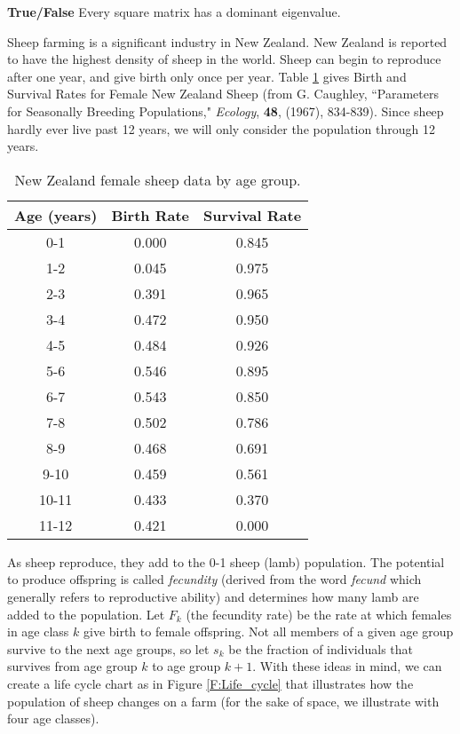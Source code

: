 \item \textbf{True/False} Every square matrix has a dominant eigenvalue. 
\ea

\ee


Sheep farming is a significant industry in New Zealand. New Zealand is reported to have the highest density of sheep in the world. Sheep can begin to reproduce after one year, and give birth only once per year. Table \ref{T:Sheep} gives Birth and Survival Rates for Female New Zealand Sheep (from G. Caughley, ``Parameters for Seasonally Breeding Populations," \emph{Ecology}, \textbf{48}, (1967), 834-839). Since sheep hardly ever live past 12 years, we will only consider the population through 12 years.
\begin{table}[h]
\begin{center}
\begin{tabular}{| c | c | c |}  \hline
Age (years) &Birth Rate 	&Survival Rate \\ \hline
0-1 		&0.000 			&0.845 \\ \hline
1-2 		&0.045 			&0.975 \\ \hline
2-3 		&0.391 			&0.965 \\ \hline
3-4 		&0.472 			&0.950 \\ \hline
4-5 		&0.484 			&0.926 \\ \hline
5-6 		&0.546 			&0.895 \\ \hline
6-7 		&0.543 			&0.850 \\ \hline
7-8 		&0.502 			&0.786 \\ \hline
8-9 		&0.468 			&0.691 \\ \hline
9-10 		&0.459 			&0.561 \\ \hline
10-11 	&0.433 			&0.370 \\ \hline
11-12 	&0.421 			&0.000 \\ \hline
\end{tabular}
\caption{New Zealand female sheep data by age group.}
\label{T:Sheep}
\end{center}
\end{table}

As sheep reproduce, they add to the 0-1 sheep (lamb) population. The potential to produce offspring is called \emph{fecundity} (derived from the word \emph{fecund} which generally refers to reproductive ability) and determines how many lamb are added to the population. Let $F_k$ (the fecundity rate) be the rate at which females in age class $k$ give birth to female offspring. Not all members of a given age group survive to the next age groups, so let $s_k$ be the fraction of individuals that survives from age group $k$ to age group $k+1$. With these ideas  in mind, we can create a life cycle chart as in Figure \ref{F:Life_cycle} that illustrates how the population of sheep changes on a farm (for the sake of space, we illustrate with four age classes). 

